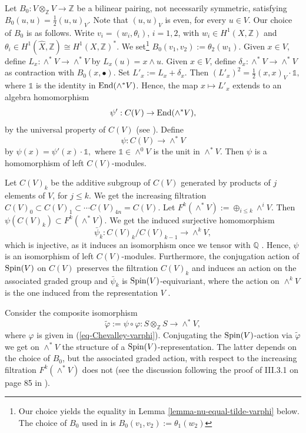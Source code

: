 \documentclass[12pt]{amsart}
\numberwithin{equation}{subsection}
\theoremstyle{plain}
\theoremstyle{definition}
\newcommand{\QQ}{{\mathbb Q}}
\newcommand{\ZZ}{{\mathbb Z}}
\newcommand{\Spin}{{\rm Spin}}
\newcommand{\End}{{\rm End}}
\newcommand{\one}{{\mathbb 1}}
\begin{document}
 Let $B_0:V\otimes_\ZZ V\rightarrow \ZZ$ be a bilinear pairing, not necessarily symmetric, satisfying $B_0(u,u)=\frac{1}{2}(u,u)_V$. Note that $(u,u)_V$ is even, for every $u\in V$.
 Our choice of $B_0$ is as follows. Write  $v_i=(w_i,\theta_i)$, $i=1,2$, with $w_i\in H^1(X,\ZZ)$ and $\theta_i\in H^1(\hat{X},\ZZ)\cong H^1(X,\ZZ)^*$. We set\footnote{Our choice yields the equality in Lemma \ref{lemma-nu-equal-tilde-varphi} below. The choice of $B_0$ used in \cite[Sec. 3.3]{chevalley} is $B_0(v_1,v_2):=\theta_1(w_2)$} 
 $B_0(v_1,v_2):=\theta_2(w_1)$.
 Given $x\in V$, define $L_x:\wedge^*V\rightarrow \wedge^*V$ by $L_x(u)=x\wedge u$. 
 Given $x\in V$, define $\delta_x:\wedge^*V\rightarrow\wedge^*V$ as contraction with $B_0(x,\bullet)$. 
 Set $L'_x:=L_x+\delta_x$. Then $(L'_x)^2=\frac{1}{2}(x,x)_V\cdot \one,$
 where $\one$ is the identity in $\End(\wedge^*V)$. Hence, the map $x\mapsto L'_x$ extends to an algebra homomorphism 
 \[
 \psi':C(V)\rightarrow \End(\wedge^*V),
 \]
 by the universal property of $C(V)$ (see \cite[II.1.1]{chevalley}). Define
 \begin{equation}
 \label{eq-psi}
 \psi:C(V)\rightarrow \wedge^*V
 \end{equation}
 by $\psi(x)=\psi'(x)\cdot \one,$ where $\one\in\wedge^0V$ is the unit  in  $\wedge^*V$. Then $\psi$ is a homomorphism of left $C(V)$-modules. 
  
 Let $C(V)_k$ be the additive subgroup of $C(V)$ generated by products of $j$ elements of $V$, for $j\leq k$. We get the increasing filtration $C(V)_0\subset C(V)_1\subset \cdots C(V)_{4n}=C(V)$. Let $F^k(\wedge^*V):=\oplus_{i\leq k}\wedge^iV.$
Then $\psi(C(V)_k)\subset F^k(\wedge^*V)$. We get the induced surjective homomorphism 
\[
\bar{\psi}_k:C(V)_k/C(V)_{k-1}\rightarrow \wedge^kV,
\]
which is injective, as it induces an isomorphism once we tensor with $\QQ$ \cite[II.1.6]{chevalley}.
 Hence, $\psi$ is an isomorphism of left $C(V)$-modules. Furthermore, the conjugation action of $\Spin(V)$ on $C(V)$ preserves the filtration $C(V)_k$ and induces an action on the associated graded group and $\bar{\psi}_k$ is $\Spin(V)$-equivariant, where the action on $\wedge^kV$ is the one induced from the representation $V$ \cite[Sec. 3.3]{chevalley}. 
 
 Consider the composite isomorphism 
 \begin{equation}
 \label{eq-tilde-varphi}
 \tilde{\varphi}:=\psi\circ\varphi:S\otimes_\ZZ S\rightarrow \wedge^*V,
 \end{equation}
 where $\varphi$ is given in (\ref{eq-Chevalley-varphi}). Conjugating the $\Spin(V)$-action via $\tilde{\varphi}$ we get on $\wedge^*V$ the structure 
of a $\Spin(V)$-representation. The latter depends on the choice of $B_0$, but the associated graded action, with respect to the increasing filtration $F^k(\wedge^*V)$ does not (see the discussion  following the proof of III.3.1 on page 85 in \cite{chevalley}).
 
\end{document}
